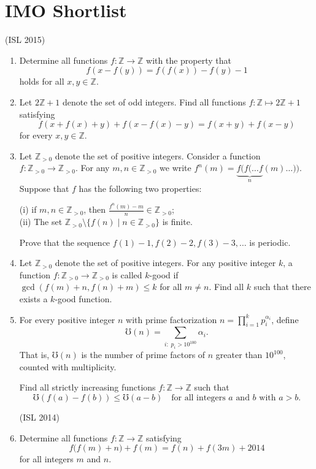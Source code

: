 \documentclass[11pt,a4paper]{article}
\begin{document}
\section{IMO Shortlist}
(ISL 2015)
\begin{enumerate}
\item Determine all functions $f:\mathbb{Z}\rightarrow\mathbb{Z}$ with the property that \[f(x-f(y))=f(f(x))-f(y)-1\]holds for all $x,y\in\mathbb{Z}$.

\item Let $2\mathbb{Z} + 1$ denote the set of odd integers. Find all functions $f:\mathbb{Z} \mapsto 2\mathbb{Z} + 1$ satisfying \[ f(x + f(x) + y) + f(x - f(x) - y) = f(x+y) + f(x-y) \]for every $x, y \in \mathbb{Z}$.

\item Let $\mathbb{Z}_{>0}$ denote the set of positive integers. Consider a function $f: \mathbb{Z}_{>0} \to \mathbb{Z}_{>0}$. For any $m, n \in \mathbb{Z}_{>0}$ we write $f^n(m) = \underbrace{f(f(\ldots f}_{n}(m)\ldots))$. Suppose that $f$ has the following two properties:

(i) if $m, n \in \mathbb{Z}_{>0}$, then $\frac{f^n(m) - m}{n} \in \mathbb{Z}_{>0}$;\\
(ii) The set $\mathbb{Z}_{>0} \setminus \{f(n) \mid n\in \mathbb{Z}_{>0}\}$ is finite.

Prove that the sequence $f(1) - 1, f(2) - 2, f(3) - 3, \ldots$ is periodic.

\item Let $\mathbb{Z}_{>0}$ denote the set of positive integers. For any positive integer $k$, a function $f: \mathbb{Z}_{>0} \to \mathbb{Z}_{>0}$ is called $k$-good if $\gcd(f(m) + n, f(n) + m) \le k$ for all $m \neq n$. Find all $k$ such that there exists a $k$-good function.

\item For every positive integer $n$ with prime factorization $n = \prod_{i = 1}^{k} p_i^{\alpha_i}$, define
\[\mho(n) = \sum_{i: \; p_i > 10^{100}} \alpha_i.\]That is, $\mho(n)$ is the number of prime factors of $n$ greater than $10^{100}$, counted with multiplicity.

Find all strictly increasing functions $f: \mathbb{Z} \to \mathbb{Z}$ such that
\[\mho(f(a) - f(b)) \le \mho(a - b) \quad \text{for all integers } a \text{ and } b \text{ with } a > b.\]

(ISL 2014)
\item Determine all functions $f: \mathbb{Z}\to\mathbb{Z}$ satisfying \[f\big(f(m)+n\big)+f(m)=f(n)+f(3m)+2014\] for all integers $m$ and $n$.


\end{enumerate}
\end{document}
